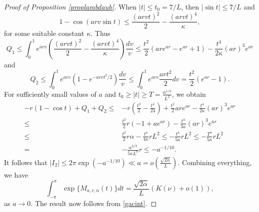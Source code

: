 \documentclass[11pt]{amsart}
\begin{document}
\begin{proof}[Proof of Proposition \ref{proplambdaub}]
When $|t| \le t_0 = 7/L$, then $|\sin t| \le 7/L$ and 
$$
1-\cos(arv \sin t) \le \frac{(arv t)^2}{2}- \frac{(arvt)^4}{\kappa},
$$
for some suitable constant $\kappa$. Thus 
$$
Q_1 \le \int_0^1 e^{arv} \left(\frac{(arv  t)^2}{2} -\frac{(arvt)^4}{\kappa}\right) \frac{dv}{v}
\le  \frac{t^2}{2} \left( ar e^{ar} - e^{ar}+1\right)- \frac{t^4}{2\kappa} (ar)^3 e^{ar}
$$
and
$$
Q_2 \le \int_0^{1} e^{arv}( 1-e^{-arv t^2/2})  \frac{dv}{v} \le  \int_0^{1} e^{arv} \frac{ar t^2}{2} dv = \frac{t^2}{2} (e^{ar}-1).
$$
For sufficiently small values of $a$ and  $t_0\ge |t| \ge T = \frac{\alpha^{1/3}}{L^2}$, we obtain
\begin{equation*}
\begin{split}
  -r(1-\cos t) + Q_1+Q_2 
 \le & -r\left(\frac{ t^2}{2}-\frac{t^4}{24}\right)+ \frac{t^2}{2} ar e^{ar}  - \frac{t^4}{2\kappa} (ar)^3 e^{ar}\\
\le & \frac{t^2}{2} r \left(-1 + a e^{ar} \right) - \frac{t^4}{3\kappa} (ar)^3 e^{ar}\\
 \le & \frac{t^2}{2} r \alpha - \frac{t^4}{4\kappa} r L^2 
\le  - \frac{t^4}{5\kappa} r   L^2 
\le  -\frac{T^4}{5\kappa} r   L^2 \\
= &  -\frac{\alpha^{4/3}}{5\kappa L^6} r \le - a^{-1/10}.
\end{split}
\end{equation*}
It follows that 
$
|I_2| \le 2 \pi \exp(- a^{-1/10}) \ll a  = o\left(\frac{\sqrt{2\alpha}}{L} \right).
$
Combining everything, we have 
$$
  \int_{-\pi}^\pi \exp\{ M_{a,r,n}(t) \} dt = \frac{\sqrt{2\alpha}}{L} ( K(\nu) + o(1)),
$$
as $a \to 0$. 
The result now follows from \eqref{gacint}.
\end{proof}
\end{document}
